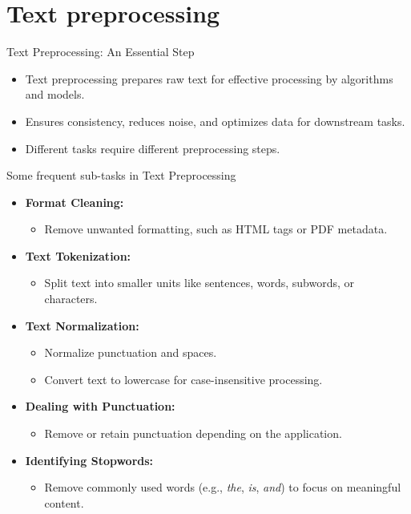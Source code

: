 \documentclass{beamer}
\begin{document}
\section{Text preprocessing}

\begin{frame}{Text Preprocessing: An Essential Step}
    \begin{itemize}
        \item Text preprocessing prepares raw text for effective processing by algorithms and models.
        \item Ensures consistency, reduces noise, and optimizes data for downstream tasks.
        \item Different tasks require different preprocessing steps.
    \end{itemize}
\end{frame}

\begin{frame}{Some frequent sub-tasks in Text Preprocessing}
    \begin{itemize}
        \item \textbf{Format Cleaning:}
        \begin{itemize}
            \item Remove unwanted formatting, such as HTML tags or PDF metadata.
        \end{itemize}
        \item \textbf{Text Tokenization:}
        \begin{itemize}
            \item Split text into smaller units like sentences, words, subwords, or characters.
        \end{itemize}
        \item \textbf{Text Normalization:}
        \begin{itemize}
            \item Normalize punctuation and spaces.
            \item Convert text to lowercase for case-insensitive processing.
        \end{itemize}
        \item \textbf{Dealing with Punctuation:}
        \begin{itemize}
            \item Remove or retain punctuation depending on the application.
        \end{itemize}
        \item \textbf{Identifying Stopwords:}
        \begin{itemize}
            \item Remove commonly used words (e.g., \textit{the}, \textit{is}, \textit{and}) to focus on meaningful content.
        \end{itemize}
    \end{itemize}
\end{frame}
\end{document}

